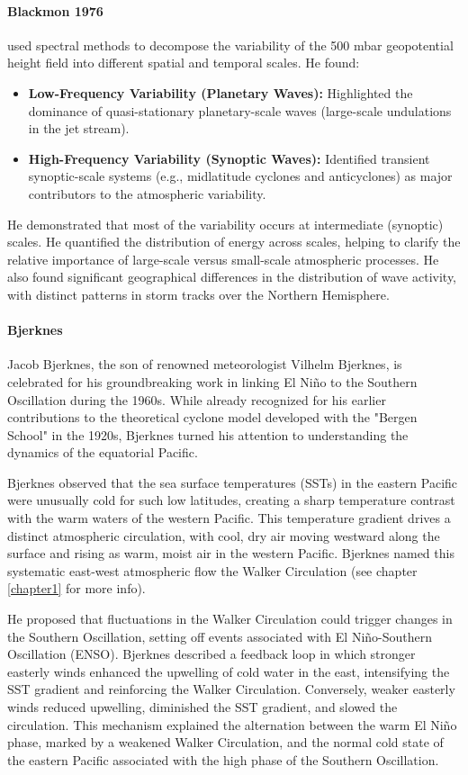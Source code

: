 \paragraph{Blackmon 1976}\cite{M.L.Blackmon1976}  used spectral methods to decompose the variability of the 500 mbar geopotential height field into different spatial and temporal scales. He found:
\begin{itemize}
	\item \textbf{Low-Frequency Variability (Planetary Waves):} Highlighted the dominance of quasi-stationary planetary-scale waves (large-scale undulations in the jet stream).
	\item \textbf{High-Frequency Variability (Synoptic Waves):} Identified transient synoptic-scale systems (e.g., midlatitude cyclones and anticyclones) as major contributors to the atmospheric variability.
\end{itemize}
He demonstrated that most of the variability occurs at intermediate (synoptic) scales. He quantified the distribution of energy across scales, helping to clarify the relative importance of large-scale versus small-scale atmospheric processes. He also found significant geographical differences in the distribution of wave activity, with distinct patterns in storm tracks over the Northern Hemisphere.

\paragraph{Bjerknes} Jacob Bjerknes, the son of renowned meteorologist Vilhelm Bjerknes, is celebrated for his groundbreaking work in linking El Niño to the Southern Oscillation during the 1960s. While already recognized for his earlier contributions to the theoretical cyclone model developed with the "Bergen School" in the 1920s, Bjerknes turned his attention to understanding the dynamics of the equatorial Pacific.

Bjerknes observed that the sea surface temperatures (SSTs) in the eastern Pacific were unusually cold for such low latitudes, creating a sharp temperature contrast with the warm waters of the western Pacific. This temperature gradient drives a distinct atmospheric circulation, with cool, dry air moving westward along the surface and rising as warm, moist air in the western Pacific. Bjerknes named this systematic east-west atmospheric flow the Walker Circulation (see chapter \ref{chapter1} for more info).

He proposed that fluctuations in the Walker Circulation could trigger changes in the Southern Oscillation, setting off events associated with El Niño-Southern Oscillation (ENSO). Bjerknes described a feedback loop in which stronger easterly winds enhanced the upwelling of cold water in the east, intensifying the SST gradient and reinforcing the Walker Circulation. Conversely, weaker easterly winds reduced upwelling, diminished the SST gradient, and slowed the circulation. This mechanism explained the alternation between the warm El Niño phase, marked by a weakened Walker Circulation, and the normal cold state of the eastern Pacific associated with the high phase of the Southern Oscillation.

